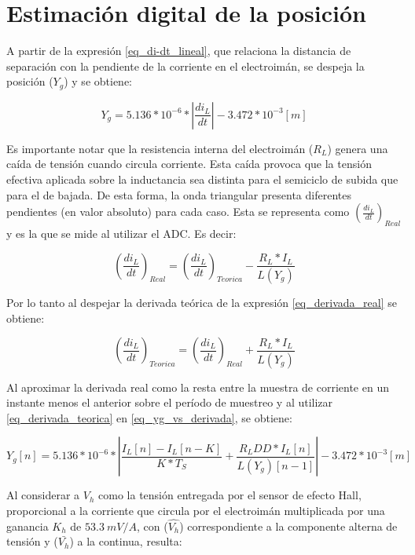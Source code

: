 \section{Estimación digital de la posición}

A partir de la expresión \ref{eq_di-dt_lineal}, que relaciona la distancia de separación con la pendiente de la corriente en el electroimán, se despeja la posición ($Y_g$) y se obtiene:

\begin{equation} \label{eq_yg_vs_derivada}
	Y_g = 5.136*10^{-6}*|\frac{di_L}{dt}|- 3.472*10^{-3} [m]
\end{equation}

\noindent Es importante notar que la resistencia interna del electroimán ($R_L$) genera una caída de tensión cuando circula corriente. Esta caída provoca que la tensión efectiva aplicada sobre la inductancia sea distinta para el semiciclo de subida que para el de bajada. De esta forma, la onda triangular presenta diferentes pendientes (en valor absoluto) para cada caso. Esta se representa como $(\frac{di_L}{dt})_{Real}$ y es la que se mide al utilizar el ADC. Es decir:


\begin{equation} \label{eq_derivada_real}
	(\frac{di_L}{dt})_{Real}=(\frac{di_L}{dt})_{Teorica}-\frac{R_L*I_L}{L(Y_g)}
\end{equation}

Por lo tanto al despejar la derivada teórica de la expresión \ref{eq_derivada_real} se obtiene:

\begin{equation} \label{eq_derivada_teorica}
	(\frac{di_L}{dt})_{Teorica}=(\frac{di_L}{dt})_{Real}+\frac{R_L*I_L}{L(Y_g)}
\end{equation}


\noindent Al aproximar la derivada real como la resta entre la muestra de corriente en un instante menos el anterior sobre el período de muestreo y al utilizar \ref{eq_derivada_teorica} en \ref{eq_yg_vs_derivada}, se obtiene:

\begin{equation} 
	Y_g[n] = 5.136*10^{-6}* |\frac{I_L[n]-I_L[n-K]}{K*T_S}+\frac{R_LDD*I_L[n]}{L(Y_g)[n-1]}| - 3.472*10^{-3} [m]
\end{equation}

\noindent Al considerar a $V_h$ como la tensión entregada por el sensor de efecto Hall, proporcional a la corriente que circula por el electroimán multiplicada por una ganancia $K_h$ de $53.3\:mV/A$, con  ($\hat{V_h}$)  correspondiente a la componente alterna de tensión y ($\bar{V_h}$) a la continua, resulta:


